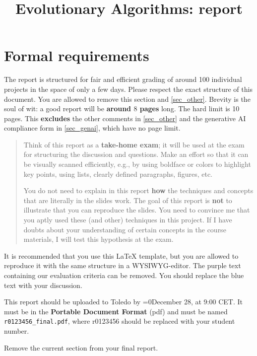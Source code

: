 \documentclass[a4paper,10pt]{article}
\title{\vspace{-2cm}Evolutionary Algorithms: \switch{Final}{Retake} report}
\author{\ReplaceMe{Your Name (r0123456)}}
\def\retake{0}
\newcommand{\switch}[2]{\ifnum\retake=0{#1}\else{#2}\fi}
\newcommand{\thisyear}{\the\year}
\newcommand{\deadlineCode}{\switch{December 28, \thisyear{} at 9:00 CET}{August 4, \thisyear{} at 9:00 CET}}
\newcommand{\deadlineReport}{\deadlineCode}
\newcommand{\RemoveMe}[1]{{\color{purple}#1}}
\begin{document}
\selectfont{}

\maketitle

\RemoveMe{
\section*{Formal requirements} \label{sec_this}

The report is structured for fair and efficient grading of around 100 individual projects in the space of only a few days. Please respect the exact structure of this document. You are allowed to remove this section and \cref{sec_other}. Brevity is the soul of wit: a good report will be \textbf{around $8$ pages} long. The hard limit is 10 pages. 
This \textbf{excludes} the other comments in \cref{sec_other} and the generative AI compliance form in \cref{sec_genai}, which have no page limit.

\begin{quote}
Think of this report as a \textbf{take-home exam}; it will be used at the exam for structuring the discussion and questions. Make an effort so that it can be visually scanned efficiently, e.g., by using boldface or colors to highlight key points, using lists, clearly defined paragraphs, figures, etc.

You do not need to explain in this report \textbf{how} the techniques and concepts that are literally in the slides work. The goal of this report is \textbf{not} to illustrate that you can reproduce the slides. You need to convince me that you aptly used these (and other) techniques in this project. If I have doubts about your understanding of certain concepts in the course materials, I will test this hypothesis at the exam.
\end{quote}

It is recommended that you use this \LaTeX{} template, but you are allowed to reproduce it with the same structure in a WYSIWYG-editor. The purple text containing our evaluation criteria can be removed. You should replace the blue text with your discussion.

This report should be uploaded to Toledo by \deadlineReport. It must be in the \textbf{Portable Document Format} (pdf) and must be named \texttt{r0123456\_final.pdf}, where r0123456 should be replaced with your student number.

Remove the current section from your final report.
}
\end{document}
